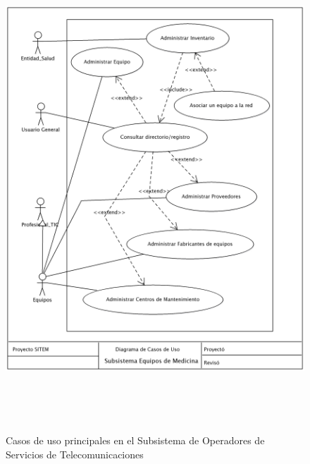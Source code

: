 \begin{figure}
 \centering
 \includegraphics[width=156mm, height=182mm]{casos_equipos.png}
 \caption{Casos de uso principales en el Subsistema de Operadores de Servicios de Telecomunicaciones}
 \label{casos_telecomunicaciones}
\end{figure}
